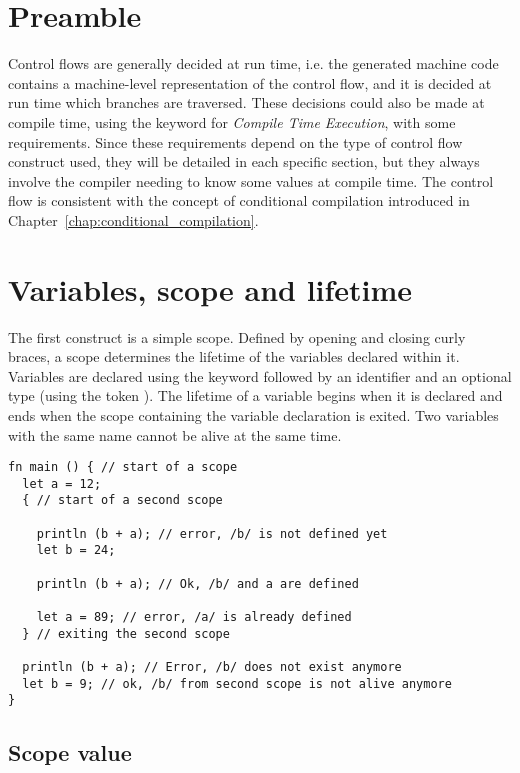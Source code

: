 \section{Preamble}

Control flows are generally decided at run time, i.e. the generated machine code
contains a machine-level representation of the control flow, and it is decided
at run time which branches are traversed. These decisions could also be made at
compile time, using the keyword  for \textit{Compile Time
  Execution}, with some requirements. Since these requirements depend on the
type of control flow construct used, they will be detailed in each specific
section, but they always involve the compiler needing to know some values at
compile time. The  control flow is consistent with the concept of
conditional compilation introduced in
Chapter~\ref{chap:conditional_compilation}.

\section{Variables, scope and lifetime}
\label{sec:variable_lifetime}

The first construct is a simple scope. Defined by opening and closing curly
braces, a scope determines the lifetime of the variables declared within it.
Variables are declared using the keyword  followed by an identifier
and an optional type (using the token \token{:}). The lifetime of a variable
begins when it is declared and ends when the scope containing the variable
declaration is exited. Two variables with the same name cannot be alive at the
same time.

\begin{lstlisting}[style=coloredverbatim]
fn main () { // start of a scope
  let a = 12;
  { // start of a second scope

    println (b + a); // error, /b/ is not defined yet
    let b = 24;

    println (b + a); // Ok, /b/ and a are defined

    let a = 89; // error, /a/ is already defined
  } // exiting the second scope

  println (b + a); // Error, /b/ does not exist anymore
  let b = 9; // ok, /b/ from second scope is not alive anymore
}
\end{lstlisting}

\subsection{Scope value}

